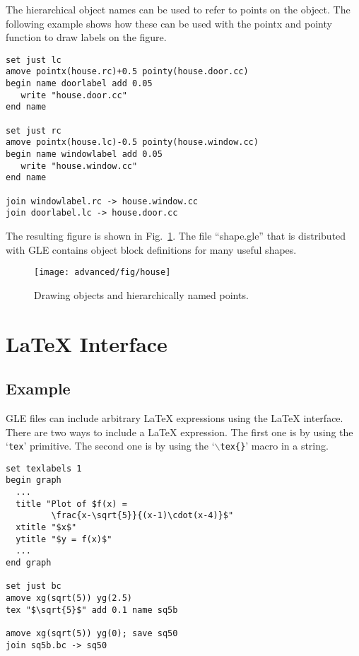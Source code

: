 The hierarchical object names can be used to refer to points on the object. The following example shows how these can be used with the pointx and pointy function to draw labels on the figure.

\begin{verbatim}
set just lc
amove pointx(house.rc)+0.5 pointy(house.door.cc)
begin name doorlabel add 0.05
   write "house.door.cc"
end name

set just rc
amove pointx(house.lc)-0.5 pointy(house.window.cc)
begin name windowlabel add 0.05
   write "house.window.cc"
end name

join windowlabel.rc -> house.window.cc
join doorlabel.lc -> house.door.cc
\end{verbatim}

The resulting figure is shown in Fig.~\ref{fig:house}. The file ``shape.gle'' that is distributed with GLE contains object block definitions for many useful shapes.

\begin{figure}[tb]
\centering
\texttt{[image: advanced/fig/house]}
\caption{\label{fig:house}Drawing objects and hierarchically named points.}
\end{figure}

\section{\texorpdfstring{\LaTeX{} Interface}{LaTeX Interface}}	
\label{latexexp:sec}

\subsection{Example}
\index{}

GLE files can include arbitrary \LaTeX{} expressions using the \LaTeX{} interface. There are two ways to include a \LaTeX{} expression. The first one is by using the `\texttt{tex}' primitive. The second one is by using the `\texttt{$\backslash{}$tex\{\}}' macro in a string.

\preglegraph{}
\begin{minipage}[c]{5cm}
\begin{Verbatim}[baselinestretch=1,fontsize=\small,fontshape=n]
set texlabels 1
begin graph
  ...
  title "Plot of $f(x) = 
         \frac{x-\sqrt{5}}{(x-1)\cdot(x-4)}$"
  xtitle "$x$"
  ytitle "$y = f(x)$"
  ...
end graph

set just bc
amove xg(sqrt(5)) yg(2.5)
tex "$\sqrt{5}$" add 0.1 name sq5b

amove xg(sqrt(5)) yg(0); save sq50
join sq5b.bc -> sq50
\end{Verbatim}
\end{minipage}
\hfill
\begin{minipage}[c]{7cm}

\end{minipage}
\postglegraph{}

